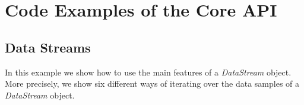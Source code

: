 \chapter{Code Examples of the Core API}\label{sec:codeExamples}


\section{Data Streams}


In this example we show how to use the main features of a \textit{DataStream} object. More precisely,  we show six different ways of iterating over the data samples of a \textit{DataStream} object.



